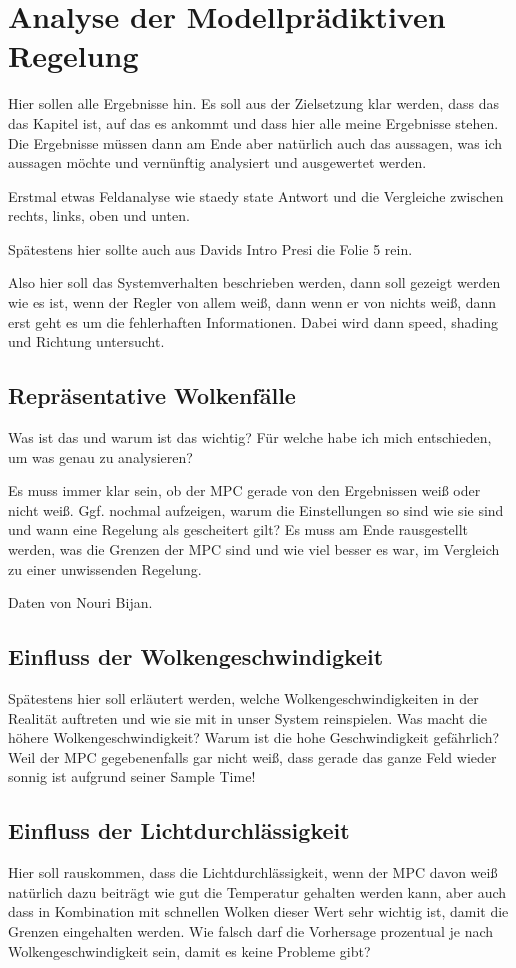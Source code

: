 \chapter{Analyse der Modellprädiktiven Regelung} \label{ch_AnalyseRegelung}
Hier sollen alle Ergebnisse hin.
Es soll aus der Zielsetzung klar werden, dass das das Kapitel ist, auf das es ankommt und dass hier alle meine Ergebnisse stehen.
Die Ergebnisse müssen dann am Ende aber natürlich auch das aussagen, was ich aussagen möchte und vernünftig analysiert und ausgewertet werden.

Erstmal etwas Feldanalyse wie staedy state Antwort und die Vergleiche zwischen rechts, links, oben und unten.

Spätestens hier sollte auch aus Davids Intro Presi die Folie 5 rein.

Also hier soll das Systemverhalten beschrieben werden, dann soll gezeigt werden wie es ist, wenn der Regler von allem weiß, dann wenn er von nichts weiß, dann erst geht es um die fehlerhaften Informationen.
Dabei wird dann speed, shading und Richtung untersucht.


\section{Repräsentative Wolkenfälle} \label{sec_Wolkenfälle}
Was ist das und warum ist das wichtig?
Für welche habe ich mich entschieden, um was genau zu analysieren?

Es muss immer klar sein, ob der MPC gerade von den Ergebnissen weiß oder nicht weiß.
Ggf. nochmal aufzeigen, warum die Einstellungen so sind wie sie sind und wann eine Regelung als gescheitert gilt?
Es muss am Ende rausgestellt werden, was die Grenzen der MPC sind und wie viel besser es war, im Vergleich zu einer unwissenden Regelung.

Daten von Nouri Bijan.


\section{Einfluss der Wolkengeschwindigkeit} \label{sec_EinflussGeschwindigkeit}
Spätestens hier soll erläutert werden, welche Wolkengeschwindigkeiten in der Realität auftreten und wie sie mit in unser System reinspielen.
Was macht die höhere Wolkengeschwindigkeit? Warum ist die hohe Geschwindigkeit gefährlich?
Weil der MPC gegebenenfalls gar nicht weiß, dass gerade das ganze Feld wieder sonnig ist aufgrund seiner Sample Time!

\section{Einfluss der Lichtdurchlässigkeit} \label{sec_EinflussLichtdurchlässigkeit}
Hier soll rauskommen, dass die Lichtdurchlässigkeit, wenn der MPC davon weiß natürlich dazu beiträgt wie gut die Temperatur gehalten werden kann, aber auch dass in Kombination mit schnellen Wolken dieser Wert sehr wichtig ist, damit die Grenzen eingehalten werden.
Wie falsch darf die Vorhersage prozentual je nach Wolkengeschwindigkeit sein, damit es keine Probleme gibt?

